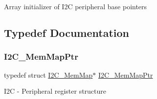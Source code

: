 Array initializer of I2C peripheral base pointers 

\subsection{Typedef Documentation}
\mbox{\label{group___i2_c___peripheral_ga9902bc02a12982d0c37ec011b4dd89f0}} 
\subsubsection{\texorpdfstring{I2\+C\+\_\+\+Mem\+Map\+Ptr}{I2C\_MemMapPtr}}
{\footnotesize\ttfamily typedef struct \hyperlink{struct_i2_c___mem_map}{I2\+C\+\_\+\+Mem\+Map}$\ast$ \hyperlink{group___i2_c___peripheral_ga9902bc02a12982d0c37ec011b4dd89f0}{I2\+C\+\_\+\+Mem\+Map\+Ptr}}

I2C -\/ Peripheral register structure 